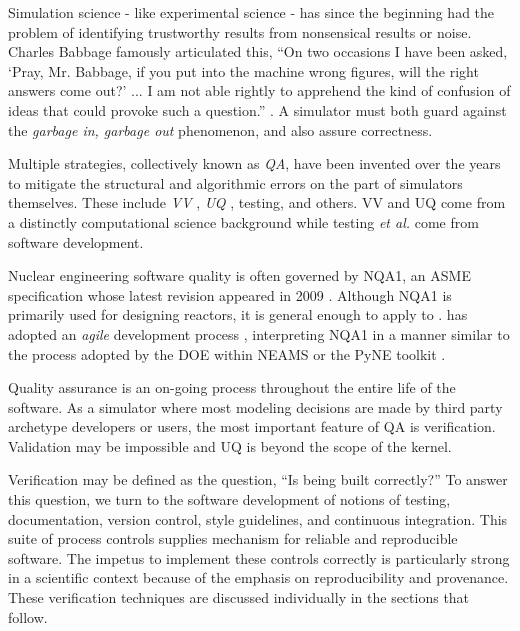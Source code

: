 
Simulation science - like experimental science - has since the beginning had the
problem of identifying trustworthy results from nonsensical results or noise.
Charles Babbage famously articulated this, ``On two occasions I have been asked,
`Pray, Mr. Babbage, if you put into the machine wrong figures, will the right
answers come out?' ... I am not able rightly to apprehend the kind of confusion
of ideas that could provoke such a question.'' \cite{babbage_passages_2011}.
A simulator must both guard against the \emph{garbage in, garbage out} phenomenon, and also assure correctness.

Multiple strategies, collectively known as \emph{\gls{QA}}, have
been invented over the years to mitigate the structural and algorithmic errors
on the part of simulators themselves. These include \emph{\gls{VV}}
\cite{boehm_software_1989}, \emph{\gls{UQ}}
\cite{sacks_design_1989}, testing, and others. \gls{VV} and \gls{UQ} come from
a distinctly computational science background while testing \emph{et al.} come from software development.

Nuclear engineering software quality is often governed by \gls{NQA1}, an
\gls{ASME} specification
whose latest revision appeared in 2009 \cite{asme_nqa-1a-2009_2009}.
Although \gls{NQA1} is primarily
used for designing reactors, it is general enough to apply to
\Cyclus. \Cyclus has adopted an \emph{agile} development process
\cite{larman_agile_2004},
interpreting \gls{NQA1} in a manner similar to the process adopted by the
\gls{DOE} within \gls{NEAMS} \cite{neams_nuclear_2013} or the
PyNE toolkit \cite{biondo_quality_2014}.

Quality assurance is an on-going process throughout the
entire life of the software. As a simulator where most modeling decisions are made
by third party archetype developers or users, the most important feature of
\gls{QA} is verification. Validation may be impossible and \gls{UQ} is beyond
the scope of the kernel.

Verification may be defined as the question, ``Is \Cyclus being built correctly?''
To answer this question, we turn to the software development of notions of testing,
documentation, version control, style guidelines, and continuous integration.
This suite of process controls supplies mechanism for reliable and reproducible
software. The impetus to implement these controls correctly is particularly strong in a scientific
context because of the emphasis on reproducibility and provenance. These verification techniques are
discussed individually in the sections that follow.

